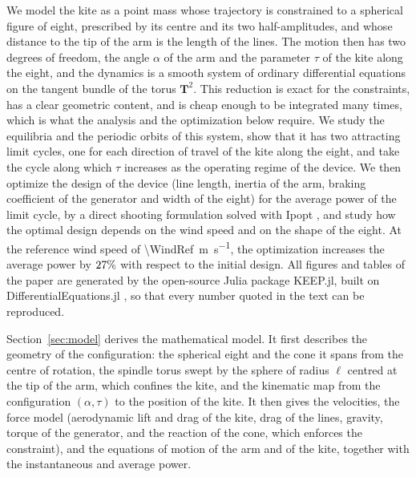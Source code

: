 We model the kite as a point mass whose trajectory is constrained to a spherical figure of eight, prescribed by its centre and its two half-amplitudes, and whose distance to the tip of the arm is the length of the lines.
The motion then has two degrees of freedom, the angle \(\alpha\) of the arm and the parameter \(\tau\) of the kite along the eight, and the dynamics is a smooth system of ordinary differential equations on the tangent bundle of the torus \(\mathbf{T}^2\).
This reduction is exact for the constraints, has a clear geometric content, and is cheap enough to be integrated many times, which is what the analysis and the optimization below require.
We study the equilibria and the periodic orbits of this system, show that it has two attracting limit cycles, one for each direction of travel of the kite along the eight, and take the cycle along which \(\tau\) increases as the operating regime of the device.
We then optimize the design of the device (line length, inertia of the arm, braking coefficient of the generator and width of the eight) for the average power of the limit cycle, by a direct shooting formulation solved with Ipopt \cite{WachterBiegler2006}, and study how the optimal design depends on the wind speed and on the shape of the eight.
At the reference wind speed of \SI{\WindRef}{\meter\per\second}, the optimization increases the average power by \(27\%\) with respect to the initial design.
All figures and tables of the paper are generated by the open-source Julia package KEEP.jl, built on DifferentialEquations.jl \cite{rackauckas2017differentialequations}, so that every number quoted in the text can be reproduced.

Section~\ref{sec:model} derives the mathematical model.
It first describes the geometry of the configuration: the spherical eight and the cone it spans from the centre of rotation, the spindle torus swept by the sphere of radius \(\ell\) centred at the tip of the arm, which confines the kite, and the kinematic map from the configuration \((\alpha,\tau)\) to the position of the kite.
It then gives the velocities, the force model (aerodynamic lift and drag of the kite, drag of the lines, gravity, torque of the generator, and the reaction of the cone, which enforces the constraint), and the equations of motion of the arm and of the kite, together with the instantaneous and average power.

